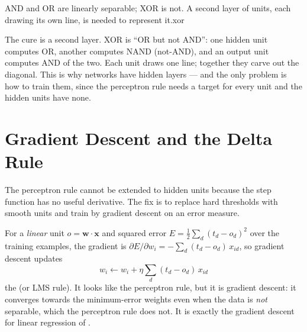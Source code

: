 %
{AND and OR are linearly separable; XOR is not. A second layer of units, each drawing its
own line, is needed to represent it.}{xor}

The cure is a second layer. XOR is ``OR but not AND'': one hidden unit computes OR,
another computes NAND (not-AND), and an output unit computes AND of the two. Each
unit draws one line; together they carve out the diagonal. This is why networks have
hidden layers --- and the only problem is how to train them, since the perceptron
rule needs a target for every unit and the hidden units have none.

\section{Gradient Descent and the Delta Rule}

The perceptron rule cannot be extended to hidden units because the step function
has no useful derivative. The fix is to replace hard thresholds with smooth units
and train by gradient descent on an error measure.

\begin{definitionbox}
For a \emph{linear} unit $o = \mathbf{w}\cdot\mathbf{x}$ and squared error
$E = \tfrac{1}{2}\sum_{d}(t_d - o_d)^2$ over the training examples, the gradient is
$\partial E/\partial w_i = -\sum_d (t_d - o_d)\,x_{id}$, so gradient descent updates
\[
w_i \leftarrow w_i + \eta\sum_d (t_d - o_d)\,x_{id}
\]
the  (or LMS rule). It looks like the perceptron rule, but it is
gradient descent: it converges towards the minimum-error weights even when the data
is \emph{not} separable, which the perceptron rule does not. It is exactly the
gradient descent for linear regression of .
\end{definitionbox}

